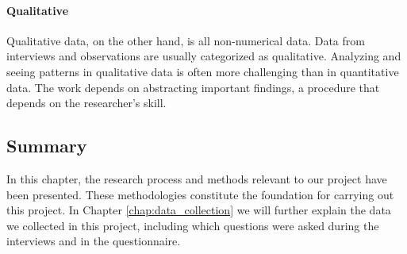 \paragraph*{Qualitative}
Qualitative data, on the other hand, is all non-numerical data. Data from interviews and observations are usually categorized as qualitative. Analyzing and seeing patterns in qualitative data is often more challenging than in quantitative data. The work depends on abstracting important findings, a procedure that depends on the researcher’s skill.

\subsection{Summary}
In this chapter, the research process and methods relevant to our project have been presented. These methodologies constitute the foundation for carrying out this project. In Chapter \ref{chap:data_collection} we will further explain the data we collected in this project, including which questions were asked during the interviews and in the questionnaire.